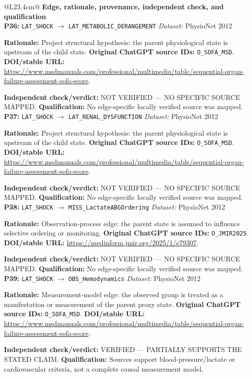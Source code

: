 \begin{tabular}{@{}L{23.4cm}@{}}
\toprule
\textbf{Edge, rationale, provenance, independent check, and qualification}\\
\midrule
\textbf{P36:} \nolinkurl{LAT_SHOCK} $\rightarrow$ \nolinkurl{LAT_METABOLIC_DERANGEMENT} \hfill \textit{Dataset:} PhysioNet 2012\par\textbf{Rationale:} Project structural hypothesis: the parent physiological state is upstream of the child state. \textbf{Original ChatGPT source IDs:} \nolinkurl{O_SOFA_MSD}. \textbf{DOI/stable URL:} \url{https://www.msdmanuals.com/professional/multimedia/table/sequential-organ-failure-assessment-sofa-score}.\par\textbf{Independent check/verdict:} NOT VERIFIED --- NO SPECIFIC SOURCE MAPPED. \textbf{Qualification:} No edge-specific locally verified source was mapped. \\
\addlinespace[2pt]
\midrule
\textbf{P37:} \nolinkurl{LAT_SHOCK} $\rightarrow$ \nolinkurl{LAT_RENAL_DYSFUNCTION} \hfill \textit{Dataset:} PhysioNet 2012\par\textbf{Rationale:} Project structural hypothesis: the parent physiological state is upstream of the child state. \textbf{Original ChatGPT source IDs:} \nolinkurl{O_SOFA_MSD}. \textbf{DOI/stable URL:} \url{https://www.msdmanuals.com/professional/multimedia/table/sequential-organ-failure-assessment-sofa-score}.\par\textbf{Independent check/verdict:} NOT VERIFIED --- NO SPECIFIC SOURCE MAPPED. \textbf{Qualification:} No edge-specific locally verified source was mapped. \\
\addlinespace[2pt]
\midrule
\textbf{P38:} \nolinkurl{LAT_SHOCK} $\rightarrow$ \nolinkurl{MISS_LactateABGOrdering} \hfill \textit{Dataset:} PhysioNet 2012\par\textbf{Rationale:} Observation-process edge: the parent state is assumed to influence selective ordering or monitoring. \textbf{Original ChatGPT source IDs:} \nolinkurl{O_JMIR2025}. \textbf{DOI/stable URL:} \url{https://medinform.jmir.org/2025/1/e79307}.\par\textbf{Independent check/verdict:} NOT VERIFIED --- NO SPECIFIC SOURCE MAPPED. \textbf{Qualification:} No edge-specific locally verified source was mapped. \\
\addlinespace[2pt]
\midrule
\textbf{P39:} \nolinkurl{LAT_SHOCK} $\rightarrow$ \nolinkurl{OBS_Hemodynamics} \hfill \textit{Dataset:} PhysioNet 2012\par\textbf{Rationale:} Measurement-model edge: the observed group is treated as a manifestation or measurement of the parent proxy state. \textbf{Original ChatGPT source IDs:} \nolinkurl{O_SOFA_MSD}. \textbf{DOI/stable URL:} \url{https://www.msdmanuals.com/professional/multimedia/table/sequential-organ-failure-assessment-sofa-score}.\par\textbf{Independent check/verdict:} VERIFIED --- PARTIALLY SUPPORTS THE STATED CLAIM. \textbf{Qualification:} Sources support blood-pressure/lactate or cardiovascular criteria, not a complete causal measurement model. \\

\end{tabular}
